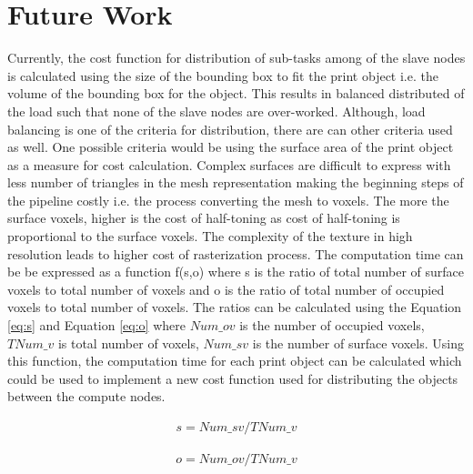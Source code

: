 \newpage   
\chapter{Future Work}

Currently, the cost function for distribution of sub-tasks among of the slave nodes is calculated using the size of the bounding box to fit the print object i.e. the volume of the bounding box for the object. This results in balanced distributed of the load such that none of the slave nodes are over-worked. Although, load balancing is one of the criteria for distribution, there are can other criteria used as well. One possible criteria would be using the surface area of the print object as a measure for cost calculation. Complex surfaces are difficult to express with less number of triangles in the mesh representation making the beginning steps of the pipeline costly i.e. the process converting the mesh to voxels. The more the surface voxels, higher is the cost of half-toning as cost of half-toning is proportional to the surface voxels. The complexity of the texture in high resolution leads to higher cost of rasterization process. The computation time can be be expressed as a function f(s,o) where s is the ratio of total number of surface voxels to total number of voxels and o is the ratio of total number of occupied voxels to total number of voxels. The ratios can be calculated using the Equation \ref{eq:s} and Equation \ref{eq:o} where \begin{math}Num\_{ov} \end{math} is the number of occupied voxels, \begin{math} TNum\_{v} \end{math} is total number of voxels, \begin{math}Num\_{sv} \end{math} is the number of surface voxels. Using this function, the computation time for each print object can be calculated which could be used to implement a new cost function used for distributing the objects between the compute nodes.  

\begin{equation}
\label{eq:s}
\begin{aligned}
s= Num\_{sv} / TNum\_{v}
\end{aligned}
\end{equation}   

\begin{equation}
\label{eq:o}
\begin{aligned}
o=  Num\_{ov} / TNum\_{v}
\end{aligned}
\end{equation}   


